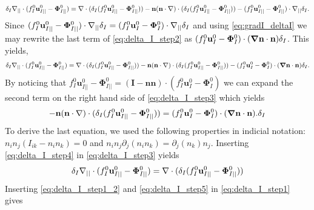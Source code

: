 \begin{equation}
    \delta_I \divI (f_I^0 \textbf{u}_{I||}^0
    - \mathbf{\Phi}_{I||}^0 ) %
    = 
    \div (\delta_I (f_I^0 \textbf{u}_{I||}^0
    - \mathbf{\Phi}_{I||}^0 ))
    - \textbf{n}(\textbf{n}\cdot\grad)\cdot (\delta_I (f_I^0 \textbf{u}_{I||}^0
    - \mathbf{\Phi}_{I||}^0 ))
    - (f_I^0 \textbf{u}_{I||}^0
    - \mathbf{\Phi}_{I||}^0 )\cdot\gradI\delta_I.
\label{eq:delta_I_step2}
\end{equation}
Since $ (f_I^0 \textbf{u}_{I||}^0 - \mathbf{\Phi}_{I||}^0 )\cdot\mathbf{\nabla}_{||}\delta_I  = (f_I^0 \textbf{u}_{I}^0 - \mathbf{\Phi}_{I}^0 )\cdot\mathbf{\nabla}_{||}\delta_I$ and using \ref{eq:gradI_deltaI} we may rewrite the last term of \ref{eq:delta_I_step2} as $(f_I^0 \textbf{u}_{I}^0 - \mathbf{\Phi}_{I}^0 )\cdot(\bm{\mathbf{\nabla}}\textbf{n}\cdot \textbf{n}) \delta_I$. This yields,
\begin{equation}
    \delta_I \divI (f_I^0 \textbf{u}_{I||}^0
    - \mathbf{\Phi}_{I||}^0 ) %
    = 
    \div (\delta_I (f_I^0 \textbf{u}_{I||}^0
    - \mathbf{\Phi}_{I||}^0 ))
    - \textbf{n}(\textbf{n}\cdot\grad)\cdot (\delta_I (f_I^0 \textbf{u}_{I||}^0
    - \mathbf{\Phi}_{I||}^0 ))
    - (f_I^0 \textbf{u}_{I}^0 - \mathbf{\Phi}_{I}^0 )\cdot(\bm\grad\textbf{n}\cdot \textbf{n}) \delta_I.
\label{eq:delta_I_step3}
\end{equation}
By noticing that $f_I^0 \textbf{u}_{I||}^0
    - \mathbf{\Phi}_{I||}^0 = (\textbf{I} - \textbf{nn})\cdot (f_I^0 \textbf{u}_{I}^0
    - \mathbf{\Phi}_{I}^0 )$ we can expand the second term on the right hand side of \ref{eq:delta_I_step3} which yields
\begin{equation}
    - \textbf{n}(\textbf{n}\cdot\grad)\cdot (\delta_I (f_I^0 \textbf{u}_{I||}^0
    - \mathbf{\Phi}_{I||}^0 )) = (f_I^0 \textbf{u}_{I}^0 - \mathbf{\Phi}_{I}^0 )\cdot(\bm\grad\textbf{n}\cdot \textbf{n}). \delta_I%
\label{eq:delta_I_step4}
\end{equation}
To derive the last equation, we used the following properties in indicial notation: $n_in_j(I_{ik}-n_in_k) =0$ and $n_in_j\partial_{j}(n_in_k)=\partial_{j}(n_k)n_j$. Inserting \ref{eq:delta_I_step4} in \ref{eq:delta_I_step3} yields
\begin{equation}
    \delta_I \divI (f_I^0 \textbf{u}_{I||}^0
    - \mathbf{\Phi}_{I||}^0 ) %
    = 
    \div (\delta_I (f_I^0 \textbf{u}_{I||}^0
    - \mathbf{\Phi}_{I||}^0 ))
\label{eq:delta_I_step5}
\end{equation}
Inserting \ref{eq:delta_I_step1_2} and \ref{eq:delta_I_step5} in \ref{eq:delta_I_step1} gives

